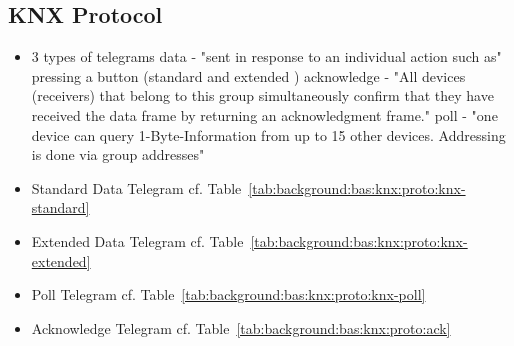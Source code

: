 	\subsection{KNX Protocol}
		\begin{itemize}
			\item 3 types of telegrams \parencite{Hubner2009} \parencite{Merz2009}
				\subitem data - "sent in response to an individual action such as" \parencite{Merz2009} pressing a button (standard and extended \parencite{Hubner2009})
				\subitem acknowledge - "All devices (receivers) that belong to this group simultaneously confirm that they have received the data frame by returning an acknowledgment frame." \parencite{Merz2009}
				\subitem poll - "one device can query 1-Byte-Information from up to 15 other devices. Addressing is done via group addresses" \parencite{Hubner2009}
			\item Standard Data Telegram
				\subitem cf. Table~\ref{tab:background:bas:knx:proto:knx-standard}
			\item Extended Data Telegram
				\subitem cf. Table~\ref{tab:background:bas:knx:proto:knx-extended}
			\item Poll Telegram
				\subitem cf. Table~\ref{tab:background:bas:knx:proto:knx-poll}
			\item Acknowledge Telegram
				\subitem cf. Table~\ref{tab:background:bas:knx:proto:ack}
			
		\end{itemize}
	
